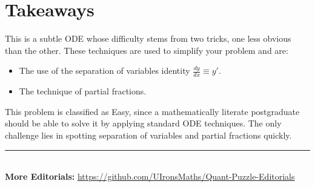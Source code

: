 \documentclass[12pt]{article}
\begin{document}
\bigskip

\section*{Takeaways}
This is a subtle ODE whose difficulty stems from two tricks, one less obvious than the other. These techniques are used to simplify your problem and are:
\begin{itemize}
    \item The use of the separation of variables identity $\frac{dy}{dx}\equiv y'$.
    \item The technique of partial fractions.
\end{itemize}
This problem is classified as Easy, since a mathematically literate postgraduate should be able to solve it by applying standard ODE techniques. The only challenge lies in spotting separation of variables and partial fractions quickly.

\vspace*{\fill}
\begin{center}
    \rule{\linewidth}{0.5pt} \\
    \textbf{More Editorials:} \href{https://github.com/UIronsMaths/Quant-Puzzle-Editorials}{https://github.com/UIronsMaths/Quant-Puzzle-Editorials}
\end{center}
\end{document}
